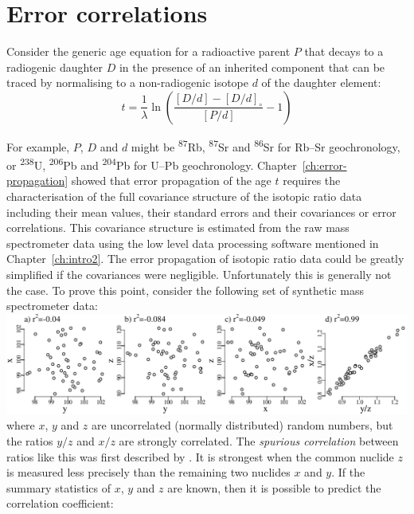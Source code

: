\begin{refsection}
\begin{enumerate}
\end{enumerate}

\section{Error correlations}
\label{sec:errorcorrelations}

Consider the generic age equation for a radioactive parent $P$
that decays to a radiogenic daughter $D$ in the presence of
an inherited component that can be traced by normalising to
a non-radiogenic isotope $d$ of the daughter element:
\begin{equation}
  t = \frac{1}{\lambda}
  \ln\left(\frac{\left[{D}/{d}\right]-\left[{D}/{d}\right]_\circ}
          {\left[{P}/{d}\right]} - 1\right)
\end{equation}

For example, $P$, $D$ and $d$ might be \textsuperscript{87}Rb,
\textsuperscript{87}Sr and \textsuperscript{86}Sr for Rb--Sr
geochronology, or \textsuperscript{238}U, \textsuperscript{206}Pb and
\textsuperscript{204}Pb for U--Pb
geochronology. Chapter~\ref{ch:error-propagation} showed that error
propagation of the age $t$ requires the characterisation of the full
covariance structure of the isotopic ratio data including their mean
values, their standard errors and their covariances or error
correlations. This covariance structure is estimated from the raw mass
spectrometer data using the low level data processing software
mentioned in Chapter~\ref{ch:intro2}.  The error propagation of
isotopic ratio data could be greatly simplified if the covariances
were negligible. Unfortunately this is generally not the case.  To
prove this point, consider the following set of synthetic mass
spectrometer data:\\

\noindent\includegraphics[width=\textwidth]{../figures/spurious}\\

\noindent where $x$, $y$ and $z$ are uncorrelated (normally
distributed) random numbers, but the ratios $y/z$ and $x/z$ are
strongly correlated. The \emph{spurious correlation} between ratios
like this was first described by \citet{pearson1896}. It is strongest
when the common nuclide $z$ is measured less precisely than the
remaining two nuclides $x$ and $y$. If the summary statistics of $x$,
$y$ and $z$ are known, then it is possible to predict the correlation
coefficient:


\end{refsection}
